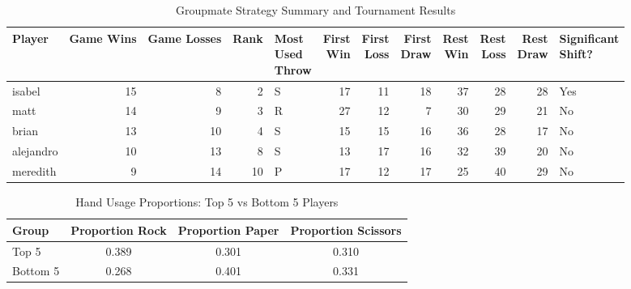 \documentclass[12pt]{article}
\begin{document}
\begin{table}[H]
\centering
\tiny
\caption{Groupmate Strategy Summary and Tournament Results}
\label{tab:groupmate_summary}
\begin{tabularx}{\textwidth}{lrrr>{\centering\arraybackslash}X rrr rrr >{\centering\arraybackslash}X}
\toprule
\textbf{Player} & \textbf{Game Wins} & \textbf{Game Losses} & \textbf{Rank} & \makecell{\textbf{Most}\\\textbf{Used}\\\textbf{Throw}} &
\makecell{\textbf{First}\\\textbf{Win}} & \makecell{\textbf{First}\\\textbf{Loss}} & \makecell{\textbf{First}\\\textbf{Draw}} &
\makecell{\textbf{Rest}\\\textbf{Win}} & \makecell{\textbf{Rest}\\\textbf{Loss}} & \makecell{\textbf{Rest}\\\textbf{Draw}} &
\makecell{\textbf{Significant}\\\textbf{Shift?}} \\
\midrule
isabel     & 15 & 8  & 2  & S & 17 & 11 & 18 & 37 & 28 & 28 & Yes \\
matt       & 14 & 9  & 3  & R & 27 & 12 &  7 & 30 & 29 & 21 & No  \\
brian      & 13 & 10 & 4  & S & 15 & 15 & 16 & 36 & 28 & 17 & No  \\
alejandro  & 10 & 13 & 8  & S & 13 & 17 & 16 & 32 & 39 & 20 & No  \\
meredith   & 9  & 14 & 10 & P & 17 & 12 & 17 & 25 & 40 & 29 & No  \\
\bottomrule
\end{tabularx}
\end{table}

\begin{table}[H]
\centering
\small
\caption{Hand Usage Proportions: Top 5 vs Bottom 5 Players}
\label{tab:top5_vs_bottom5_strategy}
\begin{tabular}{lccc}
\toprule
\textbf{Group} & \textbf{Proportion Rock} & \textbf{Proportion Paper} & \textbf{Proportion Scissors} \\
\midrule
Top 5     & 0.389 & 0.301 & 0.310 \\
Bottom 5  & 0.268 & 0.401 & 0.331 \\
\bottomrule
\end{tabular}
\end{table}
\end{document}
